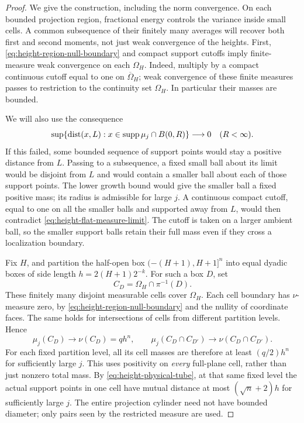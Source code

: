 \begin{proof}
We give the construction, including the norm convergence.
On each bounded projection region, fractional energy controls the
variance inside small cells. A common subsequence of their finitely many
averages will recover both first and second moments, not just weak
convergence of the heights.
First, \eqref{eq:height-region-null-boundary} and compact support cutoffs
imply finite-measure weak convergence on each $\Omega_H$.  Indeed, multiply
by a compact continuous cutoff equal to one on $\overline\Omega_H$;
weak convergence of these finite measures passes to restriction to the
continuity set $\Omega_H$.  In particular their masses are bounded.

We will also use the consequence
\begin{equation}
 \sup\{\operatorname{dist}(x,L):x\in\operatorname{supp}\mu_j\cap B(0,R)\}
                       \longrightarrow0
 \quad(R<\infty).
 \label{eq:height-physical-tube}
\end{equation}
If this failed, some bounded sequence of support points would stay a
positive distance from $L$.  Passing to a subsequence, a fixed small ball
about its limit would be disjoint from $L$ and would contain a smaller
ball about each of those support points.  The lower growth bound would
give the smaller ball a fixed positive mass; its radius is admissible
for large $j$.  A continuous compact cutoff, equal to one on all the
smaller balls and supported away from $L$, would then contradict
\eqref{eq:height-flat-measure-limit}.  The cutoff is taken on a larger
ambient ball, so the smaller support balls retain their full mass even
if they cross a localization boundary.

Fix $H$, and partition the half-open box
$(-(H+1),H+1]^n$ into equal dyadic boxes of side length
$h=2(H+1)2^{-k}$.  For such a box $D$, set
\[
 C_D=\Omega_H\cap\pi^{-1}(D).
\]
These finitely many disjoint measurable cells cover $\Omega_H$.  Each
cell boundary has $\nu$-measure zero, by
\eqref{eq:height-region-null-boundary} and the nullity of coordinate
faces.  The same holds for intersections of cells from different
partition levels.  Hence
\begin{equation}
 \mu_j(C_D)\longrightarrow\nu(C_D)=q h^n,
 \qquad
 \mu_j(C_D\cap C_{D'})\longrightarrow\nu(C_D\cap C_{D'}).
 \label{eq:height-cell-mass-limits}
\end{equation}
For each fixed partition level, all its cell masses are therefore at
least $(q/2)h^n$ for sufficiently large $j$.  This uses positivity on
\emph{every} full-plane cell, rather than just nonzero total mass.
By \eqref{eq:height-physical-tube}, at that same fixed level the actual
support points in one cell have mutual distance at most
$(\sqrt n+2)h$ for sufficiently large $j$.  The entire projection cylinder
need not have bounded diameter; only pairs seen by the restricted measure
are used.


\end{proof}
